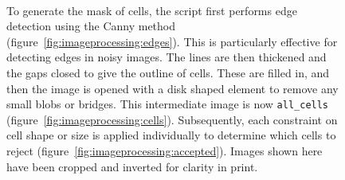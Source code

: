 \documentclass[../main.tex]{subfiles}
\begin{document}
\begin{figure}[p]
\begin{center}
\\
\caption[Depiction of cell detection]{To generate the mask of cells, the script first performs edge detection using the Canny method\citep{canny} (figure~\ref{fig:imageprocessing:edges}). This is particularly effective for detecting edges in noisy images. The lines are then thickened and the gaps closed to give the outline of cells. These are filled in, and then the image is opened with a disk shaped element to remove any small blobs or bridges. This intermediate image is now \texttt{all\_cells} (figure~\ref{fig:imageprocessing:cells}). Subsequently, each constraint on cell shape or size is applied individually to determine which cells to reject (figure~\ref{fig:imageprocessing:accepted}). Images shown here have been cropped and inverted for clarity in print.}
\label{fig:imageprocessing:celldetection}
\end{center}
\end{figure}
\end{document}
